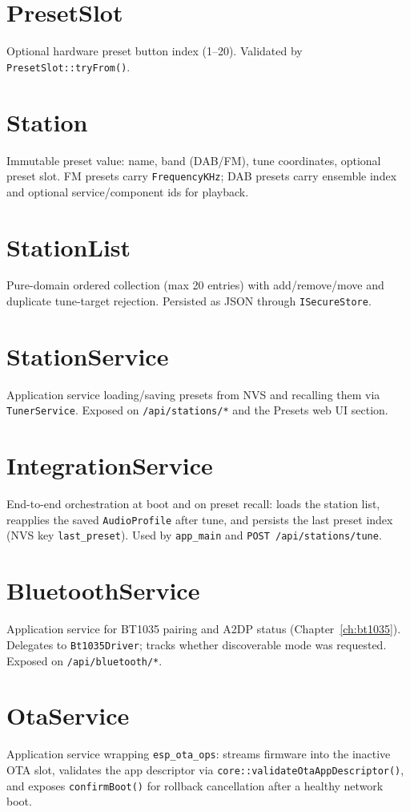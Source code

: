 \section{PresetSlot}\label{cls:PresetSlot}
Optional hardware preset button index (1--20). Validated by
\texttt{PresetSlot::tryFrom()}.

\section{Station}\label{cls:Station}
Immutable preset value: name, band (DAB/FM), tune coordinates, optional
preset slot. FM presets carry \texttt{FrequencyKHz}; DAB presets carry
ensemble index and optional service/component ids for playback.

\section{StationList}\label{cls:StationList}
Pure-domain ordered collection (max 20 entries) with add/remove/move and
duplicate tune-target rejection. Persisted as JSON through
\texttt{ISecureStore}.

\section{StationService}\label{cls:StationService}
Application service loading/saving presets from NVS and recalling them via
\texttt{TunerService}. Exposed on \texttt{/api/stations/*} and the Presets
web UI section.

\section{IntegrationService}\label{cls:IntegrationService}
End-to-end orchestration at boot and on preset recall: loads the station
list, reapplies the saved \texttt{AudioProfile} after tune, and persists
the last preset index (NVS key \texttt{last\_preset}). Used by
\texttt{app\_main} and \texttt{POST /api/stations/tune}.

\section{BluetoothService}\label{cls:BluetoothService}
Application service for BT1035 pairing and A2DP status
(Chapter~\ref{ch:bt1035}). Delegates to \texttt{Bt1035Driver}; tracks
whether discoverable mode was requested. Exposed on
\texttt{/api/bluetooth/*}.

\section{OtaService}\label{cls:OtaService}
Application service wrapping \texttt{esp\_ota\_ops}: streams firmware into
the inactive OTA slot, validates the app descriptor via
\texttt{core::validateOtaAppDescriptor()}, and exposes
\texttt{confirmBoot()} for rollback cancellation after a healthy network boot.

